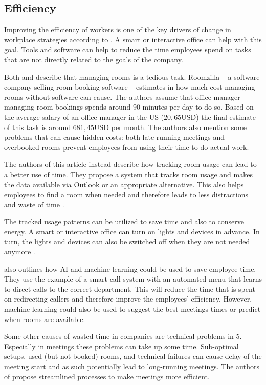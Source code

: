 \subsection{Efficiency}
Improving the efficiency of workers is one of the key drivers of change in workplace strategies according to \cite{hub13}. A smart or interactive office can help with this goal. Tools and software can help to reduce the time employees spend on tasks that are not directly related to the goals of the company.

Both \cite{iotagenda} and \cite{roomzilla9} describe that managing rooms is a tedious task. Roomzilla -- a software company selling room booking software -- estimates in \cite{roomzilla9} how much cost managing rooms without software can cause. The authors assume that office manager managing room bookings spends around 90 minutes per day to do so. Based on the average salary of an office manager in the US (\(20,65\text{USD}\)) the final estimate of this task is around \(681,45\text{USD}\) per month. The authors also mention some problems that can cause hidden costs: both late running meetings and overbooked rooms prevent employees from using their time to do actual work. 

The authors of this article instead describe how tracking room usage can lead to a better use of time. They propose a system that tracks room usage and makes the data available via Outlook or an appropriate alternative. This also helps employees to find a room when needed and therefore leads to less distractions and waste of time \cite{iotagenda}.

The tracked usage patterns can be utilized to save time and also to conserve energy. A smart or interactive office can turn on lights and devices in advance. In turn, the lights and devices can also be switched off when they are not needed anymore \cite{hbcommunications}. 


\cite{hbcommunications} also outlines how AI and machine learning could be used to save employee time. They use the example of a smart call system with an automated menu that learns to direct calls to the correct department. This will reduce the time that is spent on redirecting callers and therefore improve the employees' efficiency. However, machine learning could also be used to suggest the best meetings times or predict when rooms are available.

Some other causes of wasted time in companies are technical problems in \cite{roomzilla3}5. Especially in meetings these problems can take up some time. Sub-optimal setups, used (but not booked) rooms, and technical failures can cause delay of the meeting start and as such potentially lead to long-running meetings. The authors of \cite{roomzilla3} propose streamlined processes to make meetings more efficient. 



